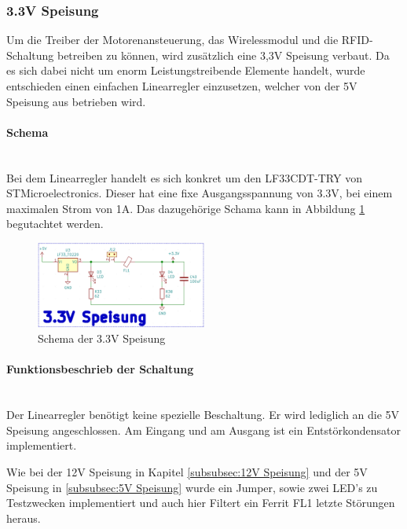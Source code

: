 \subsubsection{3.3V Speisung}
\label{subsubsec:3.3V Speisung}

Um die Treiber der Motorenansteuerung, das Wirelessmodul und die RFID-Schaltung betreiben zu können, wird zusätzlich eine 3,3V Speisung verbaut. Da es sich dabei nicht um enorm Leistungstreibende Elemente handelt, wurde entschieden einen einfachen Linearregler einzusetzen, welcher von der 5V Speisung aus betrieben wird. 

\paragraph{Schema}\mbox{}\\

Bei dem Linearregler handelt es sich konkret um den LF33CDT-TRY von STMicroelectronics. Dieser hat eine fixe Ausgangsspannung von 3.3V, bei einem maximalen Strom von 1A. Das dazugehörige Schama kann in Abbildung \ref{fig:Schema_Speisung_3.3V} begutachtet werden. \cite{stmicroelectronics_lf33cdt-try_2017}

\begin{figure}[h!]
	\centering
	\includegraphics[width=0.5\textwidth]{graphics/Schema_Speisung_3,3V.png}
	\caption{Schema der 3.3V Speisung}
	\label{fig:Schema_Speisung_3.3V}
\end{figure} 


\paragraph{Funktionsbeschrieb der Schaltung}\mbox{}\\

Der Linearregler benötigt keine spezielle Beschaltung. Er wird lediglich an die 5V Speisung angeschlossen. Am Eingang und am Ausgang ist ein Entstörkondensator implementiert. 

Wie bei der 12V Speisung in Kapitel \ref{subsubsec:12V Speisung} und der 5V Speisung in \ref{subsubsec:5V Speisung} wurde ein Jumper, sowie zwei LED's zu Testzwecken implementiert und auch hier Filtert ein Ferrit FL1 letzte Störungen heraus.